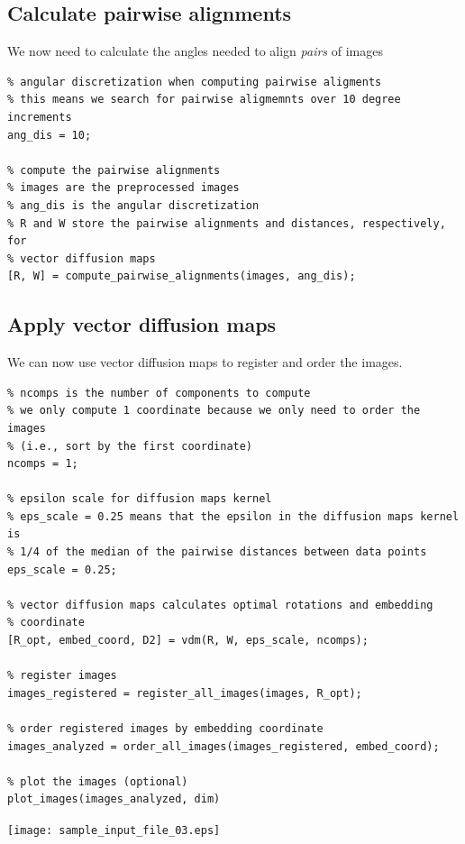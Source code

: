 \documentclass[12pt]{article}
\begin{document}
\subsection*{Calculate pairwise alignments}

\begin{par}
We now need to calculate the angles needed to align \textit{pairs} of images
\end{par} \vspace{1em}
\begin{verbatim}
% angular discretization when computing pairwise aligments
% this means we search for pairwise aligmemnts over 10 degree increments
ang_dis = 10;

% compute the pairwise alignments
% images are the preprocessed images
% ang_dis is the angular discretization
% R and W store the pairwise alignments and distances, respectively, for
% vector diffusion maps
[R, W] = compute_pairwise_alignments(images, ang_dis);
\end{verbatim}


\subsection*{Apply vector diffusion maps}

\begin{par}
We can now use vector diffusion maps to register and order the images.
\end{par} \vspace{1em}
\begin{verbatim}
% ncomps is the number of components to compute
% we only compute 1 coordinate because we only need to order the images
% (i.e., sort by the first coordinate)
ncomps = 1;

% epsilon scale for diffusion maps kernel
% eps_scale = 0.25 means that the epsilon in the diffusion maps kernel is
% 1/4 of the median of the pairwise distances between data points
eps_scale = 0.25;

% vector diffusion maps calculates optimal rotations and embedding
% coordinate
[R_opt, embed_coord, D2] = vdm(R, W, eps_scale, ncomps);

% register images
images_registered = register_all_images(images, R_opt);

% order registered images by embedding coordinate
images_analyzed = order_all_images(images_registered, embed_coord);

% plot the images (optional)
plot_images(images_analyzed, dim)
\end{verbatim}

\texttt{[image: sample\_input\_file\_03.eps]}
\end{document}
